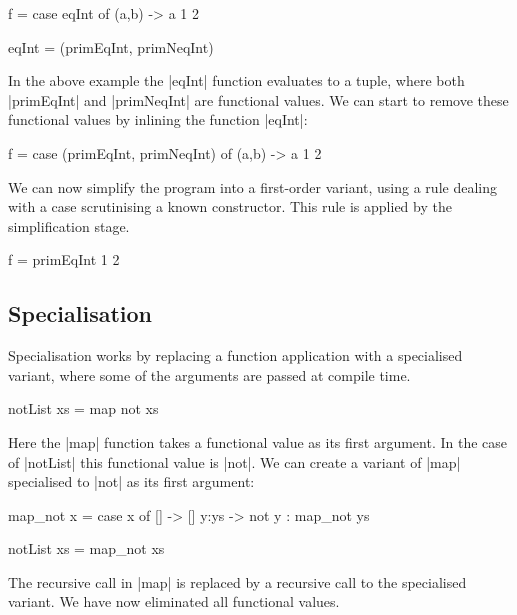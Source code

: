 \documentclass[preprint]{sigplanconf}
\begin{document}
\begin{example}
\begin{code}
f = case  eqInt of
          (a,b) -> a 1 2

eqInt = (primEqInt, primNeqInt)
\end{code}

In the above example the |eqInt| function evaluates to a tuple, where both |primEqInt| and |primNeqInt| are functional values. We can start to remove these functional values by inlining the function |eqInt|:

\begin{code}
f = case  (primEqInt, primNeqInt) of
          (a,b) -> a 1 2
\end{code}

We can now simplify the program into a first-order variant, using a rule dealing with a case scrutinising a known constructor. This rule is applied by the simplification stage.

\begin{code}
f = primEqInt 1 2
\end{code}
\end{example}

\subsection{Specialisation}

Specialisation works by replacing a function application with a specialised variant, where some of the arguments are passed at compile time.

\begin{example}
\begin{code}
notList xs = map not xs
\end{code}

Here the |map| function takes a functional value as its first argument. In the case of |notList| this functional value is |not|. We can create a variant of |map| specialised to |not| as its first argument:

\begin{code}
map_not x = case  x of
                  []    -> []
                  y:ys  -> not y : map_not ys

notList xs = map_not xs
\end{code}

The recursive call in |map| is replaced by a recursive call to the specialised variant. We have now eliminated all functional values.
\end{example}
\end{document}
